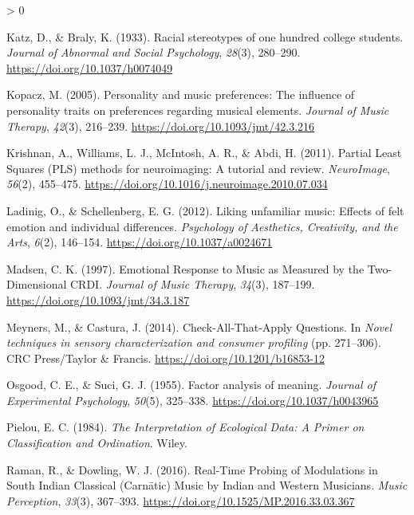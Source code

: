 \documentclass[
  english,
  man,floatsintext]{apa6}
\newlength{\cslhangindent}
\newenvironment{CSLReferences}[2] %
 {%
  \setlength{\parindent}{0pt}
  \ifodd #1 \everypar{\setlength{\hangindent}{\cslhangindent}}\ignorespaces\fi
  \ifnum #2 > 0
  \setlength{\parskip}{#2\baselineskip}
  \fi
 }%
 {}
\begin{document}
\begin{CSLReferences}{1}{0}
\leavevmode\hypertarget{ref-Katz1933}{}%
Katz, D., \& Braly, K. (1933). {Racial stereotypes of one hundred college students}. \emph{Journal of Abnormal and Social Psychology}, \emph{28}(3), 280--290. \url{https://doi.org/10.1037/h0074049}

\leavevmode\hypertarget{ref-Kopacz2005}{}%
Kopacz, M. (2005). {Personality and music preferences: The influence of personality traits on preferences regarding musical elements}. \emph{Journal of Music Therapy}, \emph{42}(3), 216--239. \url{https://doi.org/10.1093/jmt/42.3.216}

\leavevmode\hypertarget{ref-Krishnan2011}{}%
Krishnan, A., Williams, L. J., McIntosh, A. R., \& Abdi, H. (2011). {Partial Least Squares (PLS) methods for neuroimaging: A tutorial and review}. \emph{NeuroImage}, \emph{56}(2), 455--475. \url{https://doi.org/10.1016/j.neuroimage.2010.07.034}

\leavevmode\hypertarget{ref-Ladinig2012}{}%
Ladinig, O., \& Schellenberg, E. G. (2012). {Liking unfamiliar music: Effects of felt emotion and individual differences}. \emph{Psychology of Aesthetics, Creativity, and the Arts}, \emph{6}(2), 146--154. \url{https://doi.org/10.1037/a0024671}

\leavevmode\hypertarget{ref-Madsen1997}{}%
Madsen, C. K. (1997). {Emotional Response to Music as Measured by the Two-Dimensional CRDI}. \emph{Journal of Music Therapy}, \emph{34}(3), 187--199. \url{https://doi.org/10.1093/jmt/34.3.187}

\leavevmode\hypertarget{ref-Meyners2014}{}%
Meyners, M., \& Castura, J. (2014). {Check-All-That-Apply Questions}. In \emph{Novel techniques in sensory characterization and consumer profiling} (pp. 271--306). CRC Press/Taylor {\&} Francis. \url{https://doi.org/10.1201/b16853-12}

\leavevmode\hypertarget{ref-Osgood1955}{}%
Osgood, C. E., \& Suci, G. J. (1955). {Factor analysis of meaning}. \emph{Journal of Experimental Psychology}, \emph{50}(5), 325--338. \url{https://doi.org/10.1037/h0043965}

\leavevmode\hypertarget{ref-Pielou1984}{}%
Pielou, E. C. (1984). \emph{{The Interpretation of Ecological Data: A Primer on Classification and Ordination}}. Wiley.

\leavevmode\hypertarget{ref-Raman2016}{}%
Raman, R., \& Dowling, W. J. (2016). {Real-Time Probing of Modulations in South Indian Classical (Carnātic) Music by Indian and Western Musicians}. \emph{Music Perception}, \emph{33}(3), 367--393. \url{https://doi.org/10.1525/MP.2016.33.03.367}


\end{CSLReferences}
\end{document}
